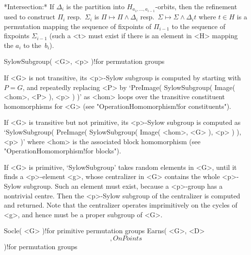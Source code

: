 
\medskip\noindent
*Intersection:*      If     $\Delta_i$   is  the       partition     into
$H_{a_1,\ldots,a_{i-1}}$-orbits, then the  refinement  used to  construct
$\Pi_i$    resp.~$\Sigma_i$    is   $\Pi\mapsto      \Pi\wedge  \Delta_i$
resp.~$\Sigma\mapsto \Sigma\wedge   \Delta_i  t$  where  $t\in  H$  is  a
permutation  mapping  the sequence  of  fixpoints of  $\Pi_{i-1}$ to  the
sequence of  fixpoints $\Sigma_{i-1}$ (such a <t>  must exist if there is
an element in <H> mapping the $a_i$ to the~$b_i$).

\>SylowSubgroup( <G>, <p> )!{for permutation groups}

If <G> is not transitive, its <p>-Sylow subgroup  is computed by starting
with  $P=G$, and repeatedly   replacing <P> by  `PreImage( SylowSubgroup(
Image( <hom>, <P>   ),  <p> ) )'   as  <hom> loops  over  the  transitive
constituent   homomorphisms  for <G>   (see    "OperationHomomorphism!for
constituents").

If  <G>  is  transitive but  not   primitive,  its <p>-Sylow subgroup  is
computed as `SylowSubgroup( PreImage( SylowSubgroup( Image( <hom>, <G> ),
<p> ) ),  <p> )' where  <hom> is the  associated block homomorphism  (see
"OperationHomomorphism!for blocks").

If <G> is primitive, `SylowSubgroup'  takes random elements in <G>, until
it finds a  <p>-element <g>, whose centralizer in  <G> contains the whole
<p>-Sylow subgroup. Such an element must exist, because a <p>-group has a
nontrivial  centre. Then the <p>-Sylow  subgroup   of the centralizer  is
computed and returned. Note  that the centralizer  operates imprimitively
on the cycles of <g>, and hence must be a proper subgroup of <G>.

\>Socle( <G> )!{for primitive permutation groups}
\>Earns( <G>, <D> \[, OnPoints \] )!{for permutation groups}

